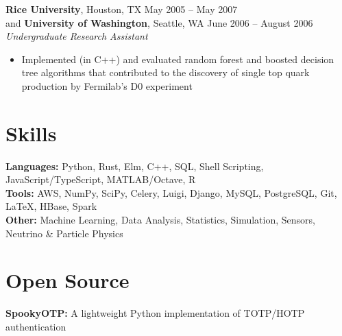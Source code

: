 \documentclass[margin,line]{resume}
\begin{document}
\begin{resume}
    \textbf{Rice University}, Houston, TX \hfill May 2005 -- May 2007 \vspace{1mm}\\\vspace{1mm}%
    and \textbf{University of Washington}, Seattle, WA \hfill June 2006 -- August 2006 \vspace{1mm}\\\vspace{1mm}%
    \textsl{Undergraduate Research Assistant}
    \begin{itemize}
    \item Implemented (in C++) and evaluated random forest and boosted decision tree algorithms that contributed to the discovery of single top quark production by Fermilab's D0 experiment
    \end{itemize}

    \section{\mysidestyle Skills}\vspace{0mm}%
    \textbf{Languages:} Python, Rust, Elm, C++, SQL, Shell Scripting, JavaScript/TypeScript, MATLAB/Octave, R
    \vspace{1mm}\\\vspace{0mm}%
    \textbf{Tools:} AWS, NumPy, SciPy, Celery, Luigi, Django, MySQL, PostgreSQL, Git, \LaTeX, HBase, Spark
    \vspace{1mm}\\\vspace{0mm}%
    \textbf{Other:} Machine Learning, Data Analysis, Statistics, Simulation, Sensors, Neutrino \& Particle Physics

    \section{\mysidestyle Open Source}\vspace{0mm}%
    \textbf{SpookyOTP:} A lightweight Python implementation of TOTP/HOTP authentication
    \vspace{1mm}%


\end{resume}
\end{document}
